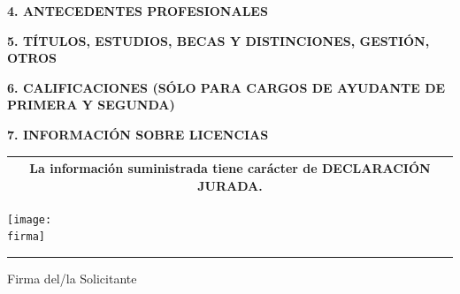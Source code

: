 \documentclass{article}
\newcommand{\titulosec}[1]{\textbf{\textsf{\MakeUppercase{#1}}}}
\begin{document}


\noindent \titulosec{4. Antecedentes profesionales}



\noindent \titulosec{5. Títulos, estudios, becas y distinciones, gestión, otros}



\noindent \titulosec{6. Calificaciones (sólo para cargos de Ayudante de Primera y Segunda)}



\noindent \titulosec{7. Información sobre licencias}

\licencias

\begin{center}
\setlength\tabcolsep{60pt}
\begin{tabular}{|c|}
    \hline
    \textbf{La información suministrada tiene carácter de DECLARACIÓN JURADA.} \\
    \hline
\end{tabular}
\end{center}

\vspace{100pt}

\begin{center}
\ifdefined\firma \texttt{[image: \\firma]}\fi

\noindent\rule{5cm}{1pt}

Firma del/la Solicitante
\end{center}
\end{document}
